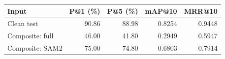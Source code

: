 \begin{tabular}{@{}lrrrr@{}}
\toprule
\textbf{Input} & \textbf{P@1 (\%)} & \textbf{P@5 (\%)} & \textbf{mAP@10} & \textbf{MRR@10} \\ \midrule
Clean test & 90.86 & 88.98 & 0.8254 & 0.9448 \\
Composite: full & 46.00 & 41.80 & 0.2949 & 0.5947 \\
Composite: SAM2 & 75.00 & 74.80 & 0.6803 & 0.7914 \\
\bottomrule
\end{tabular}
